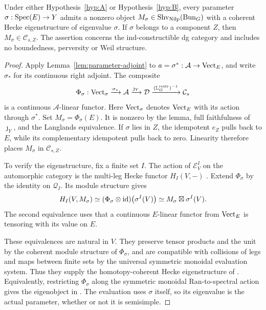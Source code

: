 \begin{corollary}\label{cor:eigenobjects}
Under either Hypothesis~\ref{hyp:A} or Hypothesis~\ref{hyp:B}, every
parameter \(\sigma:\operatorname{Spec}(E)\to Y\) admits a nonzero object
\(M_\sigma\in\operatorname{Shv}_{\operatorname{Nilp}}(\operatorname{Bun}_G)\) with a coherent Hecke eigenstructure
of eigenvalue \(\sigma\).  If \(\sigma\) belongs to a component \(Z\),
then \(M_\sigma\in\mathcal C_{s,Z}\).
The assertion concerns the ind-constructible dg category and includes
no boundedness, perversity or Weil structure.
\end{corollary}
\begin{proof}
Apply Lemma~\ref{lem:parameter-adjoint} to
\(a=\sigma^*:\mathcal A\to\operatorname{Vect}_E\), and write \(\sigma_*\) for its
continuous right adjoint.  The composite
\[
 \Phi_\sigma:
 \operatorname{Vect}_\sigma\xrightarrow{\sigma_*}\mathcal A
 \xrightarrow{\jmath_Y}\mathcal D
 \xrightarrow{(\mathbb L_G^{\mathrm{restr}})^{-1}}\mathcal C_s
\]
is a continuous \(\mathcal A\)-linear functor.  Here \(\operatorname{Vect}_\sigma\)
denotes \(\operatorname{Vect}_E\) with its action through \(\sigma^*\).
Set \(M_\sigma=\Phi_\sigma(E)\).
It is nonzero by the lemma, full faithfulness of
\(\jmath_Y\), and the Langlands equivalence.
If \(\sigma\) lies in \(Z\), the idempotent \(e_Z\) pulls back to \(E\),
while its complementary idempotent pulls back to zero.
Linearity therefore places \(M_\sigma\) in \(\mathcal C_{s,Z}\).

To verify the eigenstructure, fix a finite set \(I\).
The action of \(\mathcal E_V^I\) on the automorphic category is the
multi-leg Hecke functor \(H_I(V,-)\)
\cite[\S\S14.2--14.3]{AGKRRV}.
Extend \(\Phi_\sigma\) by the identity on \(\mathcal Q_I\).
Its module structure gives
\[
 H_I(V,M_\sigma)
 \simeq(\Phi_\sigma\otimes\operatorname{id})\bigl(\sigma^I(V)\bigr)
 \simeq M_\sigma\boxtimes\sigma^I(V).
\]
The second equivalence uses that a continuous \(E\)-linear functor from
\(\operatorname{Vect}_E\) is tensoring with its value on \(E\).

These equivalences are natural in \(V\).  They preserve tensor products
and the unit by the coherent module structure of \(\Phi_\sigma\), and
are compatible with collisions of legs and maps between finite sets by
the universal symmetric monoidal evaluation system.
Thus they supply the homotopy-coherent Hecke eigenstructure of
\cite[\S15.2]{AGKRRV}.  Equivalently, restricting \(\Phi_\sigma\) along
the symmetric monoidal Ran-to-spectral action gives the eigenobject in
\cite[\S15.1]{AGKRRV}.
The evaluation uses \(\sigma\) itself, so its eigenvalue is the actual
parameter, whether or not it is semisimple.
\end{proof}
